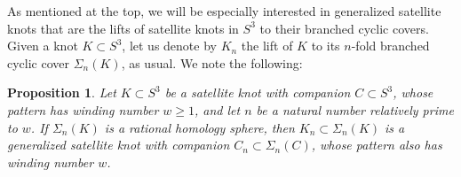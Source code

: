 \documentclass[11pt]{amsart}
\newtheorem {proposition}[theorem]{Proposition}
\numberwithin{equation}{section}
\numberwithin{theorem}{section}
\theoremstyle{definition}
\begin{document}
As mentioned at the top, we will be especially interested in generalized satellite knots that are the lifts of satellite knots in $S^3$ to their branched cyclic covers. Given a knot $K\subset S^3$, let us denote by $K_n$ the lift of $K$ to its $n$-fold branched cyclic cover $\Sigma_n(K)$, as usual. We note the following:

\begin{proposition} \label{prop:branched-cover-satellite}
Let $K \subset S^3$ be a  satellite knot with companion $C \subset S^3$, whose pattern has winding number $w \geq 1$, and let $n$ be a natural number  relatively prime to $w$.  If $\Sigma_n(K)$ is a rational homology sphere, then $K_n \subset \Sigma_n(K)$ is a generalized satellite knot with companion $C_n \subset \Sigma_n(C)$, whose pattern also has winding number $w$.
\end{proposition}
\end{document}
